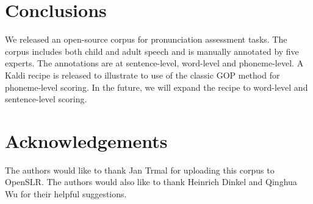 \documentclass[a4paper]{article}
\begin{document}
\section{Conclusions}
We released an open-source corpus for pronunciation assessment tasks. The corpus includes both child and adult speech and is manually annotated by five experts. The annotations are at sentence-level, word-level and phoneme-level. A Kaldi recipe is released to illustrate to use of the classic GOP method for phoneme-level scoring. In the future, we will expand the recipe to word-level and sentence-level scoring.

\section{Acknowledgements}
The authors would like to thank Jan Trmal for uploading this corpus to OpenSLR. The authors would also like to thank Heinrich Dinkel and Qinghua Wu for their helpful suggestions.





\end{document}
